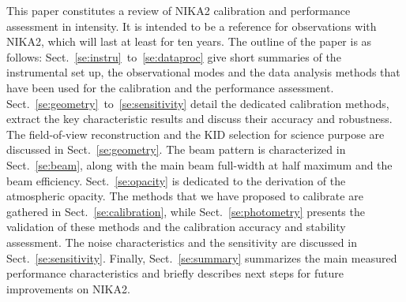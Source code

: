 This paper constitutes a review of NIKA2 calibration and
performance assessment in intensity. It is intended to be a reference
for observations with NIKA2, which will last at least for ten years. 
The outline of the paper is as follows:
Sect.~\ref{se:instru}~to~\ref{se:dataproc} give short summaries of the
instrumental set up, the observational modes and the data analysis methods
that have been used for the calibration and the performance
assessment. Sect.~\ref{se:geometry}~to~\ref{se:sensitivity} detail the
dedicated calibration methods, extract the key characteristic results
and discuss their accuracy and robustness. The field-of-view
reconstruction and the KID selection for science purpose are discussed
in Sect.~\ref{se:geometry}. The beam pattern is characterized in
Sect.~\ref{se:beam}, along with the main beam
full-width at half maximum and the beam
efficiency. Sect.~\ref{se:opacity} is dedicated to the derivation of
the atmospheric opacity. The methods that we have proposed to
calibrate are gathered in Sect.~\ref{se:calibration}, while
Sect.~\ref{se:photometry} presents the validation of these methods and
the calibration accuracy and stability assessment. The noise
characteristics and the sensitivity are discussed in
Sect.~\ref{se:sensitivity}. Finally, Sect.~\ref{se:summary} summarizes
the main measured performance characteristics and {\lp briefly
describes next steps for future improvements on NIKA2.}















